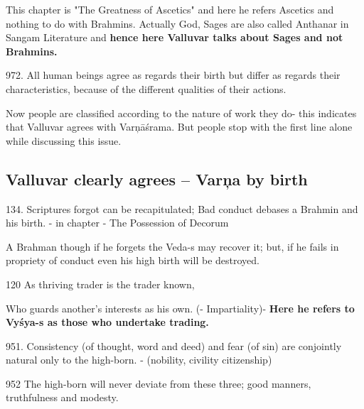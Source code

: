 This chapter is "The Greatness of Ascetics" and here he refers Ascetics and nothing to do with Brahmins. Actually God, Sages are also called Anthanar in Sangam Literature and \textbf{hence here Valluvar talks about Sages and not Brahmins.}

 972. All human beings agree as regards their birth but differ as regards their characteristics, because of the different qualities of their actions.

Now people are classified according to the nature of work they do- this indicates that Valluvar agrees with Varņāśrama. But people stop with the first line alone while discussing this issue.


\subsection*{Valluvar clearly agrees – Varņa by birth}

134. Scriptures forgot can be recapitulated; Bad conduct debases a Brahmin and his birth. - in chapter - The Possession of Decorum

A Brahman though if he forgets the Veda-s may recover it; but, if he fails in propriety of conduct even his high birth will be destroyed.

120 As thriving trader is the trader known,

\newpage

Who guards another's interests as his own. (- Impartiality)- \textbf{Here he refers to Vyśya-s as those who undertake trading.}

951. Consistency (of thought, word and deed) and fear (of sin) are conjointly natural only to the high-born. -  (nobility, civility citizenship)

952 The high-born will never deviate from these three; good manners, truthfulness and modesty. 

